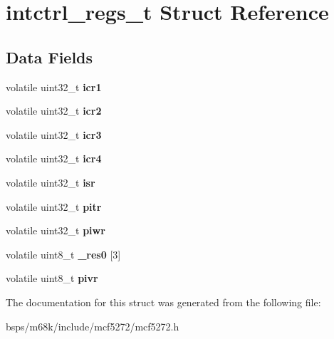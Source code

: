 \hypertarget{structintctrl__regs__t}{}\section{intctrl\+\_\+regs\+\_\+t Struct Reference}
\label{structintctrl__regs__t}
\subsection*{Data Fields}
\begin{DoxyCompactItemize}
\item 
\mbox{\label{structintctrl__regs__t_a6c8662ea73910de06d90bcb6eaa01e4d}} 
volatile uint32\+\_\+t {\bfseries icr1}
\item 
\mbox{\label{structintctrl__regs__t_a2086204c7796ca4270f24a74059b51eb}} 
volatile uint32\+\_\+t {\bfseries icr2}
\item 
\mbox{\label{structintctrl__regs__t_abdd17655ab327b2d7d10bf65bce0a346}} 
volatile uint32\+\_\+t {\bfseries icr3}
\item 
\mbox{\label{structintctrl__regs__t_a30b7a80414e589240a81c15cc6dd4f1f}} 
volatile uint32\+\_\+t {\bfseries icr4}
\item 
\mbox{\label{structintctrl__regs__t_ae972543e84379e9b0c180f3cd8cd3673}} 
volatile uint32\+\_\+t {\bfseries isr}
\item 
\mbox{\label{structintctrl__regs__t_a8efcc5f39492d880b837efabc06f6896}} 
volatile uint32\+\_\+t {\bfseries pitr}
\item 
\mbox{\label{structintctrl__regs__t_a124ba5130ae66c00a5dd34402d67ef7c}} 
volatile uint32\+\_\+t {\bfseries piwr}
\item 
\mbox{\label{structintctrl__regs__t_a123ce13e69221232c1c88c17b4a6fe57}} 
volatile uint8\+\_\+t {\bfseries \+\_\+res0} \mbox{[}3\mbox{]}
\item 
\mbox{\label{structintctrl__regs__t_aaad3f9023a6b659bb2e4b3e2babc6488}} 
volatile uint8\+\_\+t {\bfseries pivr}
\end{DoxyCompactItemize}


The documentation for this struct was generated from the following file\+:\begin{DoxyCompactItemize}
\item 
bsps/m68k/include/mcf5272/mcf5272.\+h\end{DoxyCompactItemize}
